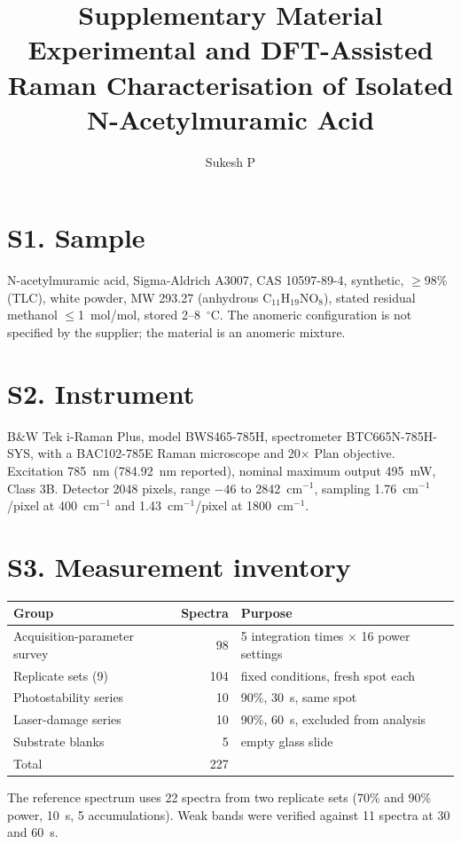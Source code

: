 \documentclass[11pt,a4paper]{article}
\title{\vspace{-2em}Supplementary Material\\[4pt]
\large Experimental and DFT-Assisted Raman Characterisation of Isolated
N-Acetylmuramic Acid}
\author{Sukesh P}\date{}
\newcommand{\wn}{\ensuremath{\mathrm{cm}^{-1}}}
\begin{document}
\maketitle

\section*{S1. Sample}
N-acetylmuramic acid, Sigma-Aldrich A3007, CAS 10597-89-4, synthetic,
$\geq$98\% (TLC), white powder, MW 293.27 (anhydrous C$_{11}$H$_{19}$NO$_8$),
stated residual methanol $\leq$1~mol/mol, stored 2--8~$^\circ$C.
The anomeric configuration is not specified by the supplier; the material is an
anomeric mixture.

\section*{S2. Instrument}
B\&W Tek i-Raman Plus, model BWS465-785H, spectrometer BTC665N-785H-SYS, with a
BAC102-785E Raman microscope and 20$\times$ Plan objective. Excitation 785~nm
(784.92~nm reported), nominal maximum output 495~mW, Class 3B. Detector 2048
pixels, range $-46$ to 2842~\wn{}, sampling 1.76~\wn{}/pixel at 400~\wn{} and
1.43~\wn{}/pixel at 1800~\wn{}.

\section*{S3. Measurement inventory}
\begin{center}
\begin{tabular}{lrl}
\toprule
Group & Spectra & Purpose \\
\midrule
Acquisition-parameter survey & 98 & 5 integration times $\times$ 16 power settings \\
Replicate sets (9) & 104 & fixed conditions, fresh spot each \\
Photostability series & 10 & 90\%, 30~s, same spot \\
Laser-damage series & 10 & 90\%, 60~s, excluded from analysis \\
Substrate blanks & 5 & empty glass slide \\
\midrule
Total & 227 & \\
\bottomrule
\end{tabular}
\end{center}

The reference spectrum uses 22 spectra from two replicate sets (70\% and 90\%
power, 10~s, 5 accumulations). Weak bands were verified against 11 spectra at
30 and 60~s.
\end{document}
